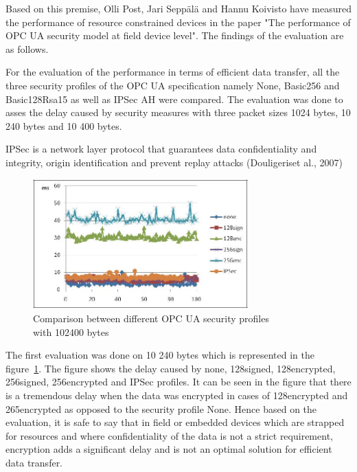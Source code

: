 \documentclass[conference]{IEEEtran}
\begin{document}
Based on this premise, Olli Post, Jari Sepp\"al\"a and Hannu Koivisto have measured the performance of resource constrained devices in the paper "The performance of OPC UA security model at field device level". The findings of the evaluation are as follows. 

For the evaluation of the performance in terms of efficient data transfer, all the three security profiles of the OPC UA specification namely None, Basic256 and Basic128Rsa15 as well as IPSec AH were compared. The evaluation was done to asses the delay caused by security measures with three packet sizes 1024 bytes, 10 240 bytes and 10 400 bytes.\cite{post2009performance}

IPSec is a network layer protocol that guarantees data confidentiality and integrity, origin identification and prevent replay attacks (Douligeriset al., 2007)\cite{post2009performance}

\begin{figure}[ht]
\centering
\includegraphics[height=50mm]{Figures/security_fig2}\quad
\caption[Subfigure example]{\label{f:security_fig2}Comparison between different OPC UA security profiles\\ with 102400 bytes \cite{post2009performance}}
\end{figure}

The first evaluation was done on 10 240 bytes which is represented in the figure~\ref{f:security_fig2}. The figure shows the delay caused by none, 128signed, 128encrypted, 256signed, 256encrypted and IPSec profiles. It can be seen in the figure that there is a tremendous delay when the data was encrypted in cases of 128encrypted and 265encrypted as opposed to the security profile None. Hence based on the evaluation, it is safe to say that in field or embedded devices which are strapped for resources and where confidentiality of the data is not a strict requirement, encryption adds a significant delay and is not an optimal solution for efficient data transfer. 
\end{document}
